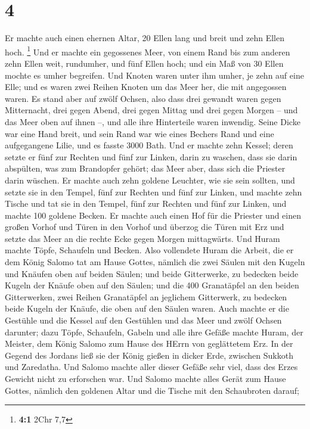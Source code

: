 \hypertarget{section-3}{%
\section{4}\label{section-3}}

 Er machte auch einen ehernen Altar, 20 Ellen lang und
breit und zehn Ellen hoch. \footnote{\textbf{4:1} 2Chr 7,7}
 Und er machte ein gegossenes Meer, von einem Rand bis zum
anderen zehn Ellen weit, rundumher, und fünf Ellen hoch; und ein Maß von
30 Ellen mochte es umher begreifen.  Und Knoten waren
unter ihm umher, je zehn auf eine Elle; und es waren zwei Reihen Knoten
um das Meer her, die mit angegossen waren.  Es stand aber
auf zwölf Ochsen, also dass drei gewandt waren gegen Mitternacht, drei
gegen Abend, drei gegen Mittag und drei gegen Morgen -- und das Meer
oben auf ihnen --, und alle ihre Hinterteile waren inwendig.
 Seine Dicke war eine Hand breit, und sein Rand war wie
eines Bechers Rand und eine aufgegangene Lilie, und es fasste 3000 Bath.
 Und er machte zehn Kessel; deren setzte er fünf zur
Rechten und fünf zur Linken, darin zu waschen, dass sie darin abspülten,
was zum Brandopfer gehört; das Meer aber, dass sich die Priester darin
wüschen.  Er machte auch zehn goldene Leuchter, wie sie
sein sollten, und setzte sie in den Tempel, fünf zur Rechten und fünf
zur Linken,  und machte zehn Tische und tat sie in den
Tempel, fünf zur Rechten und fünf zur Linken, und machte 100 goldene
Becken.  Er machte auch einen Hof für die Priester und
einen großen Vorhof und Türen in den Vorhof und überzog die Türen mit
Erz  und setzte das Meer an die rechte Ecke gegen Morgen
mittagwärts.  Und Huram machte Töpfe, Schaufeln und
Becken. Also vollendete Huram die Arbeit, die er dem König Salomo tat am
Hause Gottes,  nämlich die zwei Säulen mit den Kugeln und
Knäufen oben auf beiden Säulen; und beide Gitterwerke, zu bedecken beide
Kugeln der Knäufe oben auf den Säulen;  und die 400
Granatäpfel an den beiden Gitterwerken, zwei Reihen Granatäpfel an
jeglichem Gitterwerk, zu bedecken beide Kugeln der Knäufe, die oben auf
den Säulen waren.  Auch machte er die Gestühle und die
Kessel auf den Gestühlen  und das Meer und zwölf Ochsen
darunter;  dazu Töpfe, Schaufeln, Gabeln und alle ihre
Gefäße machte Huram, der Meister, dem König Salomo zum Hause des HErrn
von geglättetem Erz.  In der Gegend des Jordans ließ sie
der König gießen in dicker Erde, zwischen Sukkoth und Zaredatha.
 Und Salomo machte aller dieser Gefäße sehr viel, dass
des Erzes Gewicht nicht zu erforschen war.  Und Salomo
machte alles Gerät zum Hause Gottes, nämlich den goldenen Altar und die
Tische mit den Schaubroten darauf;

